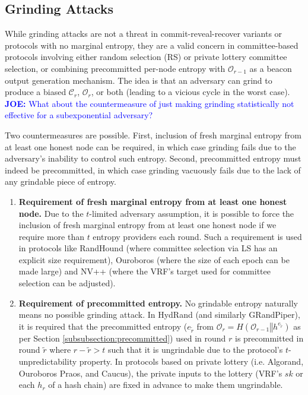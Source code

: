 \documentclass[conference]{IEEEtran}
\theoremstyle{definition}
\theoremstyle{remark}
\newcommand{\joenote}[1]{\textcolor{blue}{\textbf{JOE:} #1}}
\begin{document}
\subsection{Grinding Attacks}
While grinding attacks are not a threat in commit-reveal-recover variants or protocols with no marginal entropy, they are a valid concern in committee-based protocols involving either random selection (RS) or private lottery committee selection, or combining precommitted per-node entropy with $\mathcal{O}_{r - 1}$ as a beacon output generation mechanism. The idea is that an adversary can grind to produce a biased $\mathcal{C}_r$, $\mathcal{O}_r$, or both (leading to a vicious cycle in the worst case).
\joenote{What about the countermeasure of just making grinding statistically not effective for a subexponential adversary?}

Two countermeasures are possible. First, inclusion of fresh marginal entropy from at least one honest node can be required, in which case grinding fails due to the adversary's inability to control such entropy. Second, precommitted entropy must indeed be precommitted, in which case grinding vacuously fails due to the lack of any grindable piece of entropy.
\begin{enumerate}
\item \textbf{Requirement of fresh marginal entropy from at least one honest node.} Due to the $t$-limited adversary assumption, it is possible to force the inclusion of fresh marginal entropy from at least one honest node if we require more than $t$ entropy providers each round. Such a requirement is used in protocols like RandHound (where committee selection via LS has an explicit size requirement), Ouroboros (where the size of each epoch can be made large) and NV++ (where the VRF's target used for committee selection can be adjusted).
\item \textbf{Requirement of precommitted entropy.} No grindable entropy naturally means no possible grinding attack. In HydRand (and similarly GRandPiper), it is required that the precommitted entropy ($e_{\tilde{r}}$ from $\mathcal{O}_r = H(\mathcal{O}_{r - 1} \mathbin\Vert h^{e_{\tilde{r}}})$ as per Section \ref{subsubsection:precommitted}) used in round $r$ is precommitted in round $\tilde{r}$ where $r - \tilde{r} > t$ such that it is ungrindable due to the protocol's $t$-unpredictability property. In protocols based on private lottery (i.e. Algorand, Ouroboros Praos, and Caucus), the private inputs to the lottery (VRF's $sk$ or each $h_r$ of a hash chain) are fixed in advance to make them ungrindable.
\end{enumerate}
\end{document}
